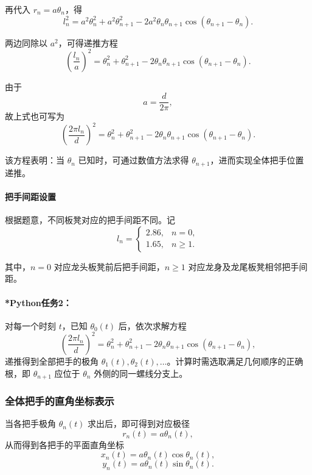 \documentclass[12pt,a4paper]{ctexart}
\begin{document}
再代入 $r_n=a\theta_n$，得
\begin{equation}
l_n^2
=a^2\theta_n^2+a^2\theta_{n+1}^2
-2a^2\theta_n\theta_{n+1}\cos(\theta_{n+1}-\theta_n).
\end{equation}

两边同除以 $a^2$，可得递推方程
\begin{equation}
\left(\frac{l_n}{a}\right)^2
=
\theta_n^2+\theta_{n+1}^2
-2\theta_n\theta_{n+1}\cos(\theta_{n+1}-\theta_n).
\end{equation}

由于
\[
a=\frac{d}{2\pi},
\]
故上式也可写为
\begin{equation}
\left(\frac{2\pi l_n}{d}\right)^2
=
\theta_n^2+\theta_{n+1}^2
-2\theta_n\theta_{n+1}\cos(\theta_{n+1}-\theta_n).
\end{equation}

该方程表明：当 $\theta_n$ 已知时，可通过数值方法求得 $\theta_{n+1}$，进而实现全体把手位置递推。

\paragraph{把手间距设置}
根据题意，不同板凳对应的把手间距不同。记
\begin{equation}
l_n=
\begin{cases}
2.86, & n=0,\\
1.65, & n\ge 1.
\end{cases}
\end{equation}

其中，$n=0$ 对应龙头板凳前后把手间距，$n\ge 1$ 对应龙身及龙尾板凳相邻把手间距。

\paragraph{*Python任务2：}
对每一个时刻 $t$，已知 $\theta_0(t)$ 后，依次求解方程
\[
\left(\frac{2\pi l_n}{d}\right)^2
=
\theta_n^2+\theta_{n+1}^2
-2\theta_n\theta_{n+1}\cos(\theta_{n+1}-\theta_n),
\]
递推得到全部把手的极角 $\theta_1(t),\theta_2(t),\dots$。计算时需选取满足几何顺序的正确根，即 $\theta_{n+1}$ 应位于 $\theta_n$ 外侧的同一螺线分支上。

\subsubsection{全体把手的直角坐标表示}
当各把手极角 $\theta_n(t)$ 求出后，即可得到对应极径
\begin{equation}
r_n(t)=a\theta_n(t),
\end{equation}
从而得到各把手的平面直角坐标
\begin{equation}
x_n(t)=a\theta_n(t)\cos\theta_n(t),
\end{equation}
\begin{equation}
y_n(t)=a\theta_n(t)\sin\theta_n(t).
\end{equation}
\end{document}
